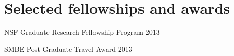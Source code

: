 \documentclass[letterpaper]{article}
\renewenvironment{itemize}{
  \begin{list}{}{
    \setlength{\leftmargin}{1.5em}
  }
}{
  \end{list}
}
\begin{document}

\section*{Selected fellowships and awards}
\begin {itemize}

\item NSF Graduate Research Fellowship Program 2013
\item SMBE Post-Graduate Travel Award 2013

\end{itemize}
\end{document}
